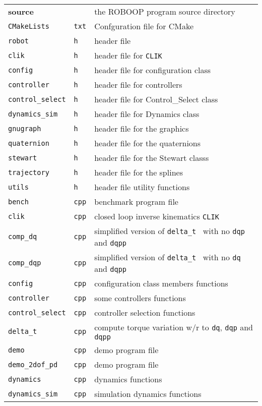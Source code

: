 \documentclass[dvips,11pt,fleqn]{report}
\begin{document}
{\begin{tabular}{lll}
{\bf source} & & the \textsf{ROBOOP} program source directory \\
{\tt CMakeLists} & {\tt txt} & Confguration file for CMake \\
{\tt robot} & {\tt h} & header file \\
{\tt clik} & {\tt h} & header file for {\tt CLIK} \\
{\tt config} & {\tt h} & header file for configuration class\\
{\tt controller} & {\tt h} & header file for controllers\\
{\tt control\_select} & {\tt h} & header file for Control\_Select class\\
{\tt dynamics\_sim} & {\tt h} & header file for Dynamics class\\
{\tt gnugraph} & {\tt h} & header file for the graphics \\
{\tt quaternion} & {\tt h} & header file for the quaternions \\
{\tt stewart} & {\tt h} & header file for the Stewart classs \\
{\tt trajectory} & {\tt h} & header file for the splines \\
{\tt utils} & {\tt h} & header file utility functions \\
{\tt bench   } & {\tt cpp} & benchmark program file \\
{\tt clik   } & {\tt cpp} & closed loop inverse kinematics {\tt CLIK} \\
{\tt comp\_dq } & {\tt cpp} & simplified version of {\tt delta\_t } with no {\tt dqp} and {\tt dqpp} \\
{\tt comp\_dqp} & {\tt cpp} & simplified version of {\tt delta\_t } with no {\tt dq} and {\tt dqpp} \\
{\tt config    } & {\tt cpp} & configuration class members functions \\
{\tt controller} & {\tt cpp} & some controllers functions\\
{\tt control\_select} & {\tt cpp} & controller selection functions\\
{\tt delta\_t } & {\tt cpp} & compute torque variation w/r to {\tt dq}, {\tt dqp} and {\tt dqpp} \\
{\tt demo    } & {\tt cpp} & demo program file \\
{\tt demo\_2dof\_pd} & {\tt cpp} & demo program file \\
{\tt dynamics} & {\tt cpp} & dynamics functions  \\
{\tt dynamics\_sim} & {\tt cpp} & simulation dynamics functions\\

\end{tabular}}
\end{document}
